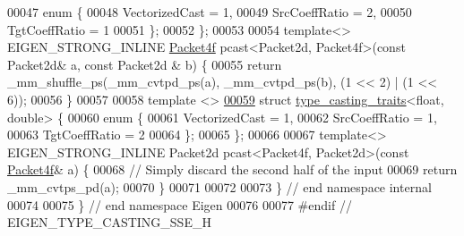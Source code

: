 \begin{DoxyCode}
00047   \textcolor{keyword}{enum} \{
00048     VectorizedCast = 1,
00049     SrcCoeffRatio = 2,
00050     TgtCoeffRatio = 1
00051   \};
00052 \};
00053 
00054 \textcolor{keyword}{template}<> EIGEN\_STRONG\_INLINE \hyperlink{struct_eigen_1_1internal_1_1_packet4f}{Packet4f} pcast<Packet2d, Packet4f>(\textcolor{keyword}{const} Packet2d& a, \textcolor{keyword}{const} Packet2d
      & b) \{
00055   \textcolor{keywordflow}{return} \_mm\_shuffle\_ps(\_mm\_cvtpd\_ps(a), \_mm\_cvtpd\_ps(b), (1 << 2) | (1 << 6));
00056 \}
00057 
00058 \textcolor{keyword}{template} <>
\hyperlink{struct_eigen_1_1internal_1_1type__casting__traits_3_01float_00_01double_01_4}{00059} \textcolor{keyword}{struct }\hyperlink{struct_eigen_1_1internal_1_1type__casting__traits}{type\_casting\_traits}<float, double> \{
00060   \textcolor{keyword}{enum} \{
00061     VectorizedCast = 1,
00062     SrcCoeffRatio = 1,
00063     TgtCoeffRatio = 2
00064   \};
00065 \};
00066 
00067 \textcolor{keyword}{template}<> EIGEN\_STRONG\_INLINE Packet2d pcast<Packet4f, Packet2d>(\textcolor{keyword}{const} \hyperlink{struct_eigen_1_1internal_1_1_packet4f}{Packet4f}& a) \{
00068   \textcolor{comment}{// Simply discard the second half of the input}
00069   \textcolor{keywordflow}{return} \_mm\_cvtps\_pd(a);
00070 \}
00071 
00072 
00073 \} \textcolor{comment}{// end namespace internal}
00074 
00075 \} \textcolor{comment}{// end namespace Eigen}
00076 
00077 \textcolor{preprocessor}{#endif // EIGEN\_TYPE\_CASTING\_SSE\_H}
\end{DoxyCode}
